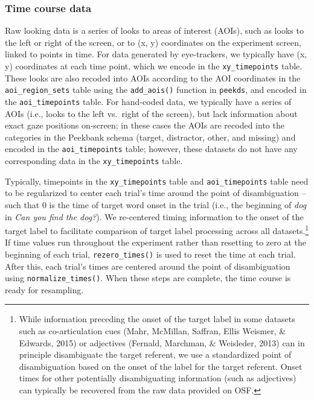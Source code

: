 \documentclass[
  english,
  man,floatsintext]{apa6}
\begin{document}
\hypertarget{time-course-data}{%
\subsubsection{Time course data}\label{time-course-data}}

Raw looking data is a series of looks to areas of interest (AOIs), such as looks to the left or right of the screen, or to (x, y) coordinates on the experiment screen, linked to points in time.
For data generated by eye-trackers, we typically have (x, y) coordinates at each time point, which we encode in the \texttt{xy\_timepoints} table.
These looks are also recoded into AOIs according to the AOI coordinates in the \texttt{aoi\_region\_sets} table using the \texttt{add\_aois()} function in \texttt{peekds}, and encoded in the \texttt{aoi\_timepoints} table.
For hand-coded data, we typically have a series of AOIs (i.e., looks to the left vs.~right of the screen), but lack information about exact gaze positions on-screen; in these cases the AOIs are recoded into the categories in the Peekbank schema (target, distractor, other, and missing) and encoded in the \texttt{aoi\_timepoints} table; however, these datasets do not have any corresponding data in the \texttt{xy\_timepoints} table.

Typically, timepoints in the \texttt{xy\_timepoints} table and \texttt{aoi\_timepoints} table need to be regularized to center each trial's time around the point of disambiguation -- such that 0 is the time of target word onset in the trial (i.e., the beginning of \emph{dog} in \emph{Can you find the dog?}).
We re-centered timing information to the onset of the target label to facilitate comparison of target label processing across all datasets.\footnote{While information preceding the onset of the target label in some datasets such as co-articulation cues (Mahr, McMillan, Saffran, Ellis Weismer, \& Edwards, 2015) or adjectives (Fernald, Marchman, \& Weisleder, 2013) can in principle disambiguate the target referent, we use a standardized point of disambiguation based on the onset of the label for the target referent. Onset times for other potentially disambiguating information (such as adjectives) can typically be recovered from the raw data provided on OSF.}
If time values run throughout the experiment rather than resetting to zero at the beginning of each trial, \texttt{rezero\_times()} is used to reset the time at each trial.
After this, each trial's times are centered around the point of disambiguation using \texttt{normalize\_times()}.
When these steps are complete, the time course is ready for resampling.
\end{document}
